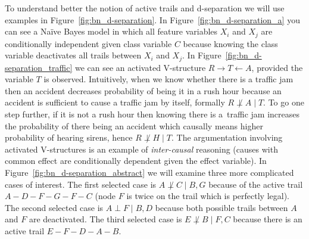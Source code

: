 \documentclass[english,cover]{fitthesis} %
\newcommand{\term}[1]{\emph{#1}}           %
\begin{document}
To understand better the notion of active trails and d-separation we will use examples in Figure~\ref{fig:bn_d-separation}. In Figure~\ref{fig:bn_d-separation_a} you can see a Naïve Bayes model in which all feature variables $X_i$ and $X_j$ are conditionally independent given class variable $C$ because knowing the class variable deactivates all trails between $X_i$ and $X_j$.
In Figure~\ref{fig:bn_d-separation_traffic} we can see an activated V-structure $R\rightarrow T \leftarrow A$, provided the variable $T$ is observed. Intuitively, when we know whether there is a traffic jam then an accident decreases probability of being it in a rush hour because an accident is sufficient to cause a traffic jam by itself, formally $R \not\perp A \mid T$. To go one step further, if it is not a rush hour then knowing there is a~traffic jam increases the probability of there being an accident which causally means higher probability of hearing sirens, hence $R\not\perp H \mid T$. The argumentation involving activated V-structures is an example of \term{inter-causal} reasoning (causes with common effect are conditionally dependent given the effect variable).
In Figure~\ref{fig:bn_d-separation_abstract} we will examine three more complicated cases of interest. The first selected case is $A \not\perp C \mid B, G$ because of the active trail $A-D-F-G-F-C$ (node $F$ is twice on the trail which is perfectly legal). The second selected case is $A \perp F \mid B, D$ because both possible trails between $A$ and $F$ are deactivated. The third selected case is $E \not\perp B \mid F, C$ because there is an active trail $E-F-D-A-B$.
\end{document}
